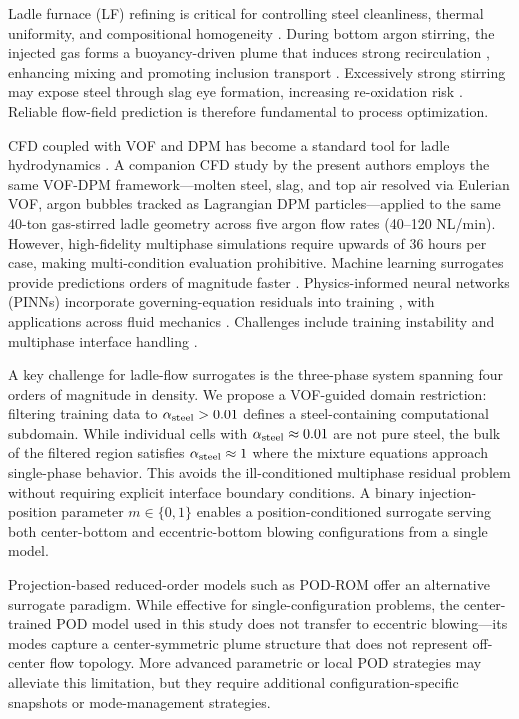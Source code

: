 \documentclass[12pt,a4paper]{article}
\begin{document}
Ladle furnace (LF) refining is critical for controlling steel cleanliness, thermal uniformity, and compositional homogeneity \cite{liu2026cfd}. During bottom argon stirring, the injected gas forms a buoyancy-driven plume that induces strong recirculation \cite{mazumdar1995physical}, enhancing mixing and promoting inclusion transport \cite{li2020numerical}. Excessively strong stirring may expose steel through slag eye formation, increasing re-oxidation risk \cite{jonsson1996modeling}. Reliable flow-field prediction is therefore fundamental to process optimization.

CFD coupled with VOF and DPM has become a standard tool for ladle hydrodynamics \cite{liu2019numerical,ersson2008fluid,cloete2010mathematical}. A companion CFD study by the present authors \cite{liu2026cfd} employs the same VOF-DPM framework---molten steel, slag, and top air resolved via Eulerian VOF, argon bubbles tracked as Lagrangian DPM particles---applied to the same 40-ton gas-stirred ladle geometry across five argon flow rates (40--120 NL/min). However, high-fidelity multiphase simulations require upwards of 36 hours per case, making multi-condition evaluation prohibitive. Machine learning surrogates provide predictions orders of magnitude faster \cite{brunton2020machine}. Physics-informed neural networks (PINNs) incorporate governing-equation residuals into training \cite{raissi2019physics,karniadakis2021physics}, with applications across fluid mechanics \cite{cai2021physics,cuomo2022scientific}. Challenges include training instability \cite{wang2021understanding} and multiphase interface handling \cite{jin2021nsfnet}.

A key challenge for ladle-flow surrogates is the three-phase system spanning four orders of magnitude in density. We propose a VOF-guided domain restriction: filtering training data to $\alpha_{\rm steel}>0.01$ defines a steel-containing computational subdomain. While individual cells with $\alpha_{\rm steel}\approx0.01$ are not pure steel, the bulk of the filtered region satisfies $\alpha_{\rm steel}\approx1$ where the mixture equations approach single-phase behavior. This avoids the ill-conditioned multiphase residual problem without requiring explicit interface boundary conditions. A binary injection-position parameter $m\in\{0,1\}$ enables a position-conditioned surrogate serving both center-bottom and eccentric-bottom blowing configurations from a single model.

Projection-based reduced-order models such as POD-ROM \cite{benner2015survey} offer an alternative surrogate paradigm. While effective for single-configuration problems, the center-trained POD model used in this study does not transfer to eccentric blowing---its modes capture a center-symmetric plume structure that does not represent off-center flow topology. More advanced parametric or local POD strategies may alleviate this limitation, but they require additional configuration-specific snapshots or mode-management strategies.
\end{document}
